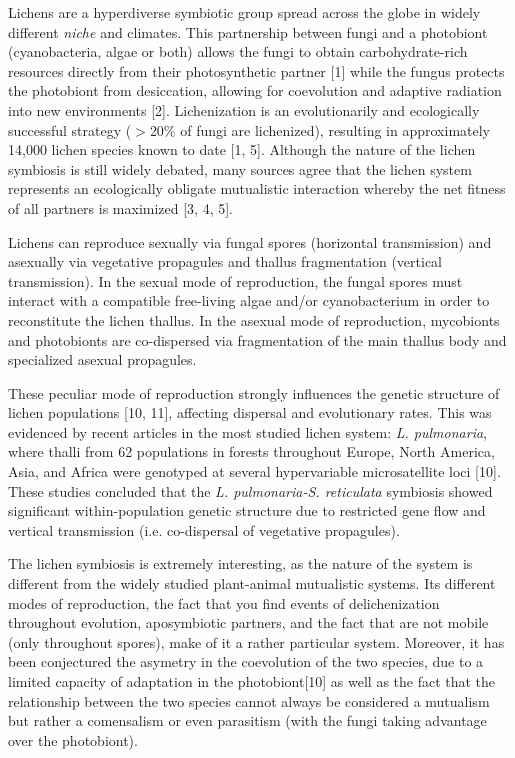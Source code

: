 Lichens are a hyperdiverse symbiotic group spread across the globe in widely different {\em niche} and climates. This partnership between fungi and a photobiont (cyanobacteria, algae or both) allows the fungi to obtain carbohydrate-rich resources directly from their photosynthetic partner [1] while the fungus protects the photobiont from desiccation, allowing for coevolution and adaptive radiation into new environments [2]. Lichenization is an evolutionarily and ecologically successful strategy ($>$20\% of fungi are lichenized), resulting in approximately 14,000 lichen species known to date [1, 5]. Although the nature of the lichen symbiosis is still widely debated, many sources agree that the lichen system represents an ecologically obligate mutualistic interaction whereby the net fitness of all partners is maximized [3, 4, 5].

Lichens can reproduce sexually via fungal spores (horizontal transmission) and asexually via vegetative propagules and thallus fragmentation (vertical transmission). In the sexual mode of reproduction, the fungal spores must interact with a compatible free-living algae and/or cyanobacterium in order to reconstitute the lichen thallus. In the asexual mode of reproduction, mycobionts and photobionts are co-dispersed via fragmentation of the main thallus body and specialized asexual propagules.

These peculiar mode of reproduction strongly influences the genetic structure of lichen populations [10, 11], affecting dispersal and evolutionary rates. This was evidenced by recent articles in the most studied lichen system: {\em L. pulmonaria}, where thalli from 62 populations in forests throughout Europe, North America, Asia, and Africa were genotyped at several hypervariable microsatellite loci [10]. These studies concluded that the {\em L. pulmonaria-S. reticulata} symbiosis showed significant within-population genetic structure due to restricted gene flow and vertical transmission (i.e. co-dispersal of vegetative propagules). 

The lichen symbiosis is extremely interesting, as the nature of the system is different from the widely studied plant-animal mutualistic systems. Its different modes of reproduction, the fact that you find events of delichenization throughout evolution, aposymbiotic partners, and the fact that are not mobile (only throughout spores), make of it a rather particular system. Moreover, it has been conjectured the asymetry in the coevolution of the two species, due to a limited capacity of adaptation in the photobiont[10] as well as the fact that the relationship between the two species cannot always be considered a mutualism but rather a comensalism or even parasitism (with the fungi taking advantage over the photobiont). 

